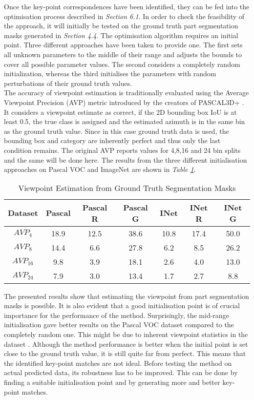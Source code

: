 \documentclass[main.tex]{subfiles}
\begin{document}
\indent Once the key-point correspondences have been identified, they can be fed into the optimisation process described in \emph{Section 6.1}. In order to check the feasibility of the approach, it will initially be tested on the ground truth part segmentation masks generated in \emph{Section 4.4}. The optimisation algorithm requires an initial point. Three different approaches have been taken to provide one. The first sets all unknown parameters to the middle of their range and adjusts the bounds to cover all possible parameter values. The second considers a completely random initialization, whereas the third initialises the parameters with random perturbations of their ground truth values. \\
\indent The accuracy of viewpoint estimation is traditionally evaluated using the Average Viewpoint Precision (AVP) metric introduced by the creators of PASCAL3D+ \cite{Xiang2014}. It considers a viewpoint estimate as correct, if the 2D bounding box IoU is at least 0.5, the true class is assigned and the estimated azimuth is in the same bin as the ground truth value. Since in this case ground truth data is used, the bounding box and category are inherently perfect and thus only the last condition remains. The original AVP reports values for 4,8,16 and 24 bin splits and the same will be done here. The results from the three different initialisation approaches on Pascal VOC and ImageNet are shown in \emph{Table \ref{tab:viewest}}.\\
\begin{table}[H]
	\centering
	\begin{tabular}{| c || c | c | c | c | c | c |}
		\hline 
  		\textbf{Dataset} & Pascal & Pascal R & Pascal G & INet & INet R & INet G \\
  		\hline
   		\textbf{$AVP_4$} & 18.9 & 12.5 & 38.6 & 10.8 & 17.4 & 50.0  \\
		\hline  		
   		\textbf{$AVP_8$} & 14.4 & 6.6 & 27.8 & 6.2 & 8.5 & 26.2 \\
		\hline   		
   		\textbf{$AVP_{16}$} & 9.8 & 3.9 & 18.1 & 2.6 & 4.0 & 13.0 \\
		\hline   		
   		\textbf{$AVP_{24}$} & 7.9 & 3.0 & 13.4 & 1.7 & 2.7 & 8.8\\
		\hline
	\end{tabular}	
\caption{Viewpoint Estimation from Ground Truth Segmentation Masks}
\label{tab:viewest}
\end{table}
\indent The presented results show that estimating the viewpoint from part segmentation masks is possible. It is also evident that a good initialisation point is of crucial importance for the performance of the method. Surprisingly, the mid-range initialisation gave better results on the Pascal VOC dataset compared to the completely random one. This might be due to inherent viewpoint statistics in the dataset \cite{Xiang2014}. Although the method performance is better when the initial point is set close to the ground truth value, it is still quite far from perfect. This means that the identified key-point matches are not ideal. Before testing the method on actual predicted data, its robustness has to be improved. This can be done by finding a suitable initialisation point and by generating more and better key-point matches.
\end{document}
